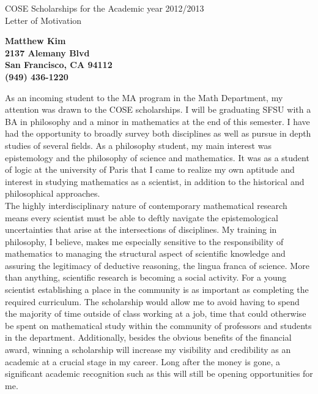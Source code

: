 \documentclass[11pt]{letter} %
\begin{document}
\signature{Matthew Kim}                  %
\longindentation=0pt                       %
\let\raggedleft\raggedright                %
 
\begin{letter}{COSE Scholarships for the Academic year 2012/2013\\
 Letter of Motivation} 

\begin{center}
\large\bf Matthew Kim\\
2137 Alemany Blvd\\ San Francisco, CA 94112\\ (949) 436-1220
\end{center} 
\vfill %

\opening{} 

	As an incoming student to the MA program in the Math Department, my attention was drawn to the COSE scholarships.   I will be graduating SFSU with a BA in philosophy and a minor in mathematics at the end of this semester. I have had the opportunity to broadly survey both disciplines as well as pursue in depth studies of several fields. As a philosophy student, my main interest was epistemology and the philosophy of science and mathematics.  It was as a student of logic at the university of Paris that I came to realize my own aptitude and interest in studying mathematics as a scientist, in addition to the historical and philosophical approaches. \\
	 
	The highly interdisciplinary nature of contemporary mathematical research means every scientist must be able to deftly navigate the epistemological uncertainties that arise at the intersections of disciplines.  My training in philosophy, I believe, makes me especially sensitive to the responsibility of mathematics to managing the structural aspect of scientific knowledge and assuring the legitimacy of deductive reasoning, the lingua franca of science.  More than anything, scientific research is becoming a social activity.   For a young scientist establishing a place in the community is as important as completing the required curriculum.  The scholarship would allow me to avoid having to spend the majority of time outside of class working at a job, time that could otherwise be spent on mathematical study within the community of professors and students in the department.  Additionally, besides the obvious benefits of the financial award, winning a scholarship will increase my visibility and credibility as an academic at a crucial stage in my career.  Long after the money is gone, a significant academic recognition such as this will still be opening opportunities for me.  \\
	

\end{letter}
\end{document}
